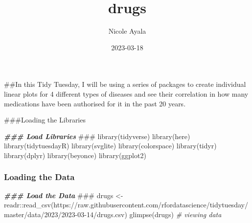 \documentclass[
]{article}
\title{drugs}
\author{Nicole Ayala}
\date{2023-03-18}
\newenvironment{Shaded}{\begin{snugshade}}{\end{snugshade}}
\newcommand{\AlertTok}[1]{\textcolor[rgb]{0.94,0.16,0.16}{#1}}
\newcommand{\CommentTok}[1]{\textcolor[rgb]{0.56,0.35,0.01}{\textit{#1}}}
\newcommand{\DocumentationTok}[1]{\textcolor[rgb]{0.56,0.35,0.01}{\textbf{\textit{#1}}}}
\newcommand{\FunctionTok}[1]{\textcolor[rgb]{0.00,0.00,0.00}{#1}}
\newcommand{\NormalTok}[1]{#1}
\newcommand{\OtherTok}[1]{\textcolor[rgb]{0.56,0.35,0.01}{#1}}
\newcommand{\SpecialCharTok}[1]{\textcolor[rgb]{0.00,0.00,0.00}{#1}}
\newcommand{\StringTok}[1]{\textcolor[rgb]{0.31,0.60,0.02}{#1}}
\begin{document}
\maketitle

\#\#In this Tidy Tuesday, I will be using a series of packages to create
individual linear plots for 4 different types of diseases and see their
correlation in how many medications have been authorised for it in the
past 20 years.

\#\#\#Loading the Libraries

\begin{Shaded}
\begin{Highlighting}[]
\DocumentationTok{\#\#\# Load Libraries }\AlertTok{\#\#\#}
\FunctionTok{library}\NormalTok{(tidyverse)}
\FunctionTok{library}\NormalTok{(here)}
\FunctionTok{library}\NormalTok{(tidytuesdayR)}
\FunctionTok{library}\NormalTok{(svglite)}
\FunctionTok{library}\NormalTok{(colorspace)}
\FunctionTok{library}\NormalTok{(tidyr)}
\FunctionTok{library}\NormalTok{(dplyr)}
\FunctionTok{library}\NormalTok{(beyonce)}
\FunctionTok{library}\NormalTok{(ggplot2)}
\end{Highlighting}
\end{Shaded}

\hypertarget{loading-the-data}{%
\subsubsection{Loading the Data}\label{loading-the-data}}

\begin{Shaded}
\begin{Highlighting}[]
\DocumentationTok{\#\#\# Load the Data }\AlertTok{\#\#\#}
\NormalTok{drugs }\OtherTok{\textless{}{-}}\NormalTok{ readr}\SpecialCharTok{::}\FunctionTok{read\_csv}\NormalTok{(}\StringTok{\textquotesingle{}https://raw.githubusercontent.com/rfordatascience/tidytuesday/master/data/2023/2023{-}03{-}14/drugs.csv\textquotesingle{}}\NormalTok{)}
\FunctionTok{glimpse}\NormalTok{(drugs) }\CommentTok{\# viewing data}
\end{Highlighting}
\end{Shaded}
\end{document}
